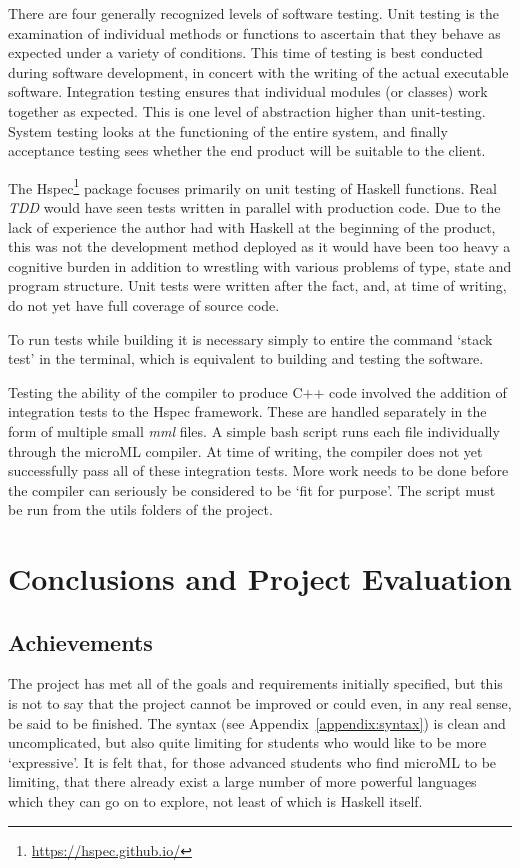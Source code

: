 \documentclass[12pt, a4paper]{report}
\begin{document}
There are four generally recognized levels of software testing. Unit testing is the examination of
individual methods or functions to ascertain that they behave as expected under a variety of
conditions. This time of testing is best conducted during software development, in concert with the
writing of the actual executable software. Integration testing ensures that individual modules (or
classes) work together as expected. This is one level of abstraction higher than unit-testing.
System testing looks at the functioning of the entire system, and finally acceptance testing sees
whether the end product will be suitable to the client. 

The Hspec\footnote{\url{https://hspec.github.io/}} package focuses primarily on unit testing of
Haskell functions. Real \textit{TDD} would have seen tests written in parallel with production code.
Due to the lack of experience the author had with Haskell at the beginning of the product, this was
not the development method deployed as it would have been too heavy a cognitive burden in addition
to wrestling with various problems of type, state and program structure. Unit tests were written
after the fact, and, at time of writing, do not yet have full coverage of source code.

To run tests while building it is necessary simply to entire the command `stack test' in the
terminal, which is equivalent to building and testing the software.

Testing the ability of the compiler to produce C++ code involved the addition of integration tests
to the Hspec framework. These are handled separately in the form of multiple small \textit{mml}
files. A simple bash script runs each file individually through the microML compiler. At time of
writing, the compiler does not yet successfully pass all of these integration tests. More work needs
to be done before the compiler can seriously be considered to be `fit for purpose'. The script must
be run from the utils folders of the project.

\chapter{Conclusions and Project Evaluation}

\section{Achievements}
The project has met all of the goals and requirements initially specified, but this is not to say
that the project cannot be improved or could even, in any real sense, be said to be finished. The
syntax (see Appendix~\ref{appendix:syntax}) is clean and uncomplicated, but also quite limiting for
students who would like to be more `expressive'. It is felt that, for those advanced students who
find microML to be limiting, that there already exist a large number of more powerful languages
which they can go on to explore, not least of which is Haskell itself. 
\end{document}
